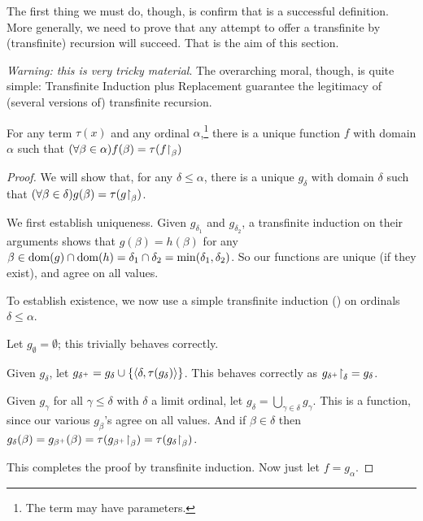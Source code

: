 \documentclass[../../../include/open-logic-section]{subfiles}
\begin{document}

The first thing we must do, though, is confirm that
 is a successful definition. More generally,
we need to prove that any attempt to offer a transfinite by
(transfinite) recursion will succeed. That is the aim of this section.

\emph{Warning: this is very tricky material}. The overarching moral,
though, is quite simple: Transfinite Induction plus Replacement
guarantee the legitimacy of (several versions of) transfinite
recursion.

\begin{thm}
For any term $\tau(x)$ and any ordinal $\alpha$,\footnote{The term may
have parameters.} there is a unique function $f$ with domain $\alpha$
such that $(\forall \beta \in \alpha)f(\beta) =
\tau(f\mathord{\restriction}_{\beta})$
\end{thm}

\begin{proof}
We will show that, for any $\delta \leq \alpha$, there is a unique
$g_\delta$ with domain $\delta$ such that $(\forall \beta \in
\delta)g(\beta) = \tau(g\mathord{\restriction}_{\beta})$. 

We first establish uniqueness. Given $g_{\delta_1}$ and
$g_{\delta_2}$, a transfinite induction on their arguments shows that
$g(\beta) = h(\beta)$ for any $\beta \in \mathrm{dom}(g) \cap \mathrm{dom}(h) =
\delta_1 \cap \delta_2 = \min(\delta_1, \delta_2)$. So our functions
are unique (if they exist), and agree on all values.

To establish existence, we now use a simple transfinite induction
() on ordinals
$\delta \leq \alpha$. 

Let $g_\emptyset = \emptyset$; this trivially behaves correctly.

Given $g_\delta$, let $g_{\delta^{+}} =  g_\delta \cup
\{\langle \delta, \tau(g_\delta) \rangle\}$. This behaves correctly as
$g_{\delta^{+}}\mathord{\restriction}_{\delta} = g_\delta$. 

Given $g_\gamma$ for all $\gamma \leq \delta$ with $\delta$ a limit
ordinal, let $g_\delta = \bigcup_{\gamma \in \delta} g_\gamma$. This
is a function, since our various $g_\beta$'s agree on all values. And
if $\beta \in \delta$ then $g_\delta(\beta) =
g_{\beta^{+}}(\beta) =
\tau(g_{\beta^{+}}\mathord{\restriction}_{\beta}) =
\tau(g_\delta\mathord{\restriction}_{\beta})$.

This completes the proof by transfinite induction. Now just let $f = g_\alpha$.
\end{proof}
\end{document}
